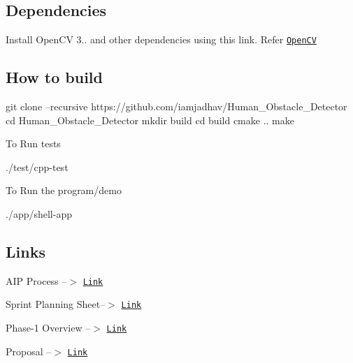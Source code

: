 \subsection*{Dependencies}


\begin{DoxyItemize}
\item Install Open\+CV 3.. and other dependencies using this link. Refer \href{https://learnopencv.com/install-opencv-3-4-4-on-ubuntu-18-04/}{\tt Open\+CV}
\end{DoxyItemize}

\subsection*{How to build}


\begin{DoxyCode}
git clone --recursive https://github.com/iamjadhav/Human\_Obstacle\_Detector
cd Human\_Obstacle\_Detector
mkdir build
cd build
cmake ..
make
\end{DoxyCode}


To Run tests 
\begin{DoxyCode}
./test/cpp-test
\end{DoxyCode}
 To Run the program/demo 
\begin{DoxyCode}
./app/shell-app
\end{DoxyCode}


\subsection*{Links}

A\+IP Process --$>$ \href{https://docs.google.com/spreadsheets/d/1bapR4zMCzfcwQHhxAm6KktWsMINTTPEt/edit#gid=2052063551}{\tt Link}

Sprint Planning Sheet--$>$ \href{https://docs.google.com/document/d/1Xaz2rZ7OrmSh3bSE351XQz483VGetJkJdF37AjUF9Ro/edit}{\tt Link}

Phase-\/1 Overview --$>$ \href{https://youtu.be/lwNjuT5e-FM}{\tt Link}

Proposal --$>$ \href{https://youtu.be/2ptUw7MpsMc}{\tt Link} 